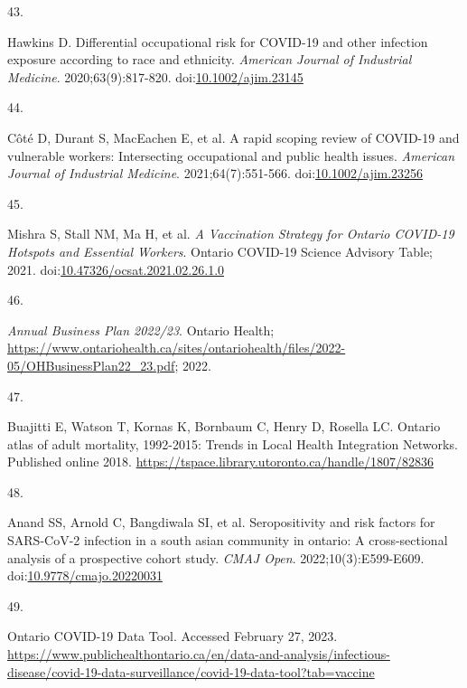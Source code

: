 \documentclass[
  letterpaper,
  DIV=11,
  numbers=noendperiod]{scrartcl}
\newlength{\cslhangindent}
\newlength{\csllabelwidth}
\newlength{\cslentryspacingunit} %
\newenvironment{CSLReferences}[2] %
 {%
  \setlength{\parindent}{0pt}
  \ifodd #1
  \let\oldpar\par
  \def\par{\hangindent=\cslhangindent\oldpar}
  \fi
  \setlength{\parskip}{#2\cslentryspacingunit}
 }%
 {}
\newcommand{\CSLLeftMargin}[1]{\parbox[t]{\csllabelwidth}{#1}}
\newcommand{\CSLRightInline}[1]{\parbox[t]{\linewidth - \csllabelwidth}{#1}\break}
\begin{document}
\begin{CSLReferences}{0}{0}
\leavevmode{}%
\CSLLeftMargin{43. }%
\CSLRightInline{Hawkins D. Differential occupational risk for {COVID}-19
and other infection exposure according to race and ethnicity.
\emph{American Journal of Industrial Medicine}. 2020;63(9):817-820.
doi:\href{https://doi.org/10.1002/ajim.23145}{10.1002/ajim.23145}}

\leavevmode{}%
\CSLLeftMargin{44. }%
\CSLRightInline{Côté D, Durant S, MacEachen E, et al. A rapid scoping
review of {COVID}-19 and vulnerable workers: Intersecting occupational
and public health issues. \emph{American Journal of Industrial
Medicine}. 2021;64(7):551-566.
doi:\href{https://doi.org/10.1002/ajim.23256}{10.1002/ajim.23256}}

\leavevmode{}%
\CSLLeftMargin{45. }%
\CSLRightInline{Mishra S, Stall NM, Ma H, et al. \emph{A Vaccination
Strategy for Ontario {COVID}-19 Hotspots and Essential Workers}. Ontario
{COVID}-19 Science Advisory Table; 2021.
doi:\href{https://doi.org/10.47326/ocsat.2021.02.26.1.0}{10.47326/ocsat.2021.02.26.1.0}}

\leavevmode{}%
\CSLLeftMargin{46. }%
\CSLRightInline{\emph{{A}nnual {B}usiness {P}lan 2022/23}. Ontario
Health;
\url{https://www.ontariohealth.ca/sites/ontariohealth/files/2022-05/OHBusinessPlan22_23.pdf};
2022.}

\leavevmode{}%
\CSLLeftMargin{47. }%
\CSLRightInline{Buajitti E, Watson T, Kornas K, Bornbaum C, Henry D,
Rosella LC. Ontario atlas of adult mortality, 1992-2015: Trends in
{L}ocal {H}ealth {I}ntegration {N}etworks. Published online 2018.
\url{https://tspace.library.utoronto.ca/handle/1807/82836}}

\leavevmode{}%
\CSLLeftMargin{48. }%
\CSLRightInline{Anand SS, Arnold C, Bangdiwala SI, et al. Seropositivity
and risk factors for {SARS}-{CoV}-2 infection in a south asian community
in ontario: A cross-sectional analysis of a prospective cohort study.
\emph{{CMAJ} Open}. 2022;10(3):E599-E609.
doi:\href{https://doi.org/10.9778/cmajo.20220031}{10.9778/cmajo.20220031}}

\leavevmode{}%
\CSLLeftMargin{49. }%
\CSLRightInline{{Ontario COVID-19 Data Tool}. Accessed February 27,
2023.
\url{https://www.publichealthontario.ca/en/data-and-analysis/infectious-disease/covid-19-data-surveillance/covid-19-data-tool?tab=vaccine}}


\end{CSLReferences}
\end{document}

